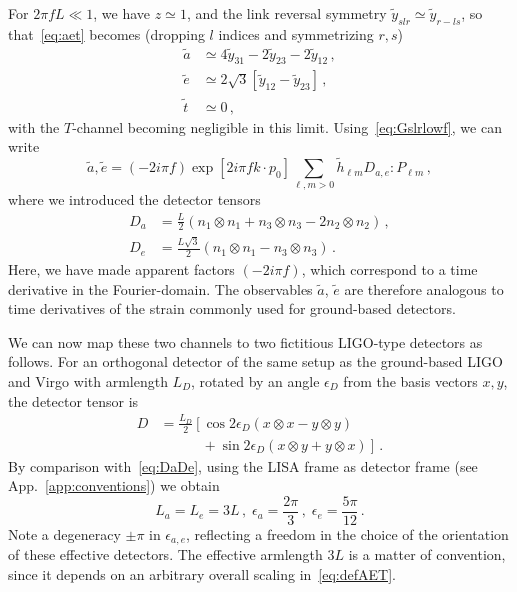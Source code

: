 \documentclass[aps,showpacs,twocolumn,prd,superscriptaddress,nofootinbib]{revtex4-1}
\newcommand{\be}{\begin{equation}}
\newcommand{\ee}{\end{equation}}
\newcommand{\bsub}{\begin{subequations}}
\newcommand{\esub}{\end{subequations}}
\newcommand{\nn}{\nonumber}
\begin{document}
For $2\pi f L \ll 1$, we have $z\simeq 1$, and the link reversal symmetry $\tilde{y}_{slr} \simeq \tilde{y}_{r-ls}$, so that~\eqref{eq:aet} becomes (dropping $l$ indices and symmetrizing $r,s$)
\bsub\label{eq:aetlowf}
\begin{align}
	\tilde{a} &\simeq 4\tilde{y}_{31} - 2 \tilde{y}_{23} - 2 \tilde{y}_{12} \,,\\
	\tilde{e} &\simeq 2\sqrt{3} \left[ \tilde{y}_{12}  - \tilde{y}_{23} \right] \,,\\
	\tilde{t} &\simeq 0 \,,
\end{align}
\esub
with the $T$-channel becoming negligible in this limit. Using~\eqref{eq:Gslrlowf}, we can write
\be\label{eq:aelowfmodes}
	\tilde{a}, \tilde{e} = (-2i\pi f) \exp\left[ 2 i \pi f k\cdot p_{0} \right] \sum_{\ell, m>0} \tilde{h}_{\ell m} D_{a,e} : P_{\ell m} \,,
\ee
where we introduced the detector tensors
\bsub\label{eq:DaDe}
\begin{align}
	D_{a} &= \frac{L}{2} \left( n_{1}\otimes n_{1} + n_{3} \otimes n_{3} - 2 n_{2} \otimes n_{2} \right) \,,\\
	D_{e} &= \frac{L\sqrt{3}}{2} \left( n_{1} \otimes n_{1} - n_{3} \otimes n_{3} \right) \,.
\end{align}
\esub
Here, we have made apparent factors $(-2i\pi f)$, which correspond to a time derivative in the Fourier-domain.
The observables $\tilde{a}$, $\tilde{e}$ are therefore analogous to time derivatives of the strain commonly used for ground-based detectors.

We can now map these two channels to two fictitious LIGO-type detectors as follows. For an orthogonal detector of the same setup as the ground-based LIGO and Virgo with armlength $L_{D}$, rotated by an angle $\epsilon_{D}$ from the basis vectors $x,y$, the detector tensor is
\begin{align}
	D &= \frac{L_{D}}{2} \left[ \cos 2\epsilon_{D} \left( x\otimes x - y\otimes y \right) \right. \nn\\
	& \qquad\quad + \left. \sin 2\epsilon_{D} \left( x\otimes y + y \otimes x\right) \right] \,.
\end{align}
By comparison with~\eqref{eq:DaDe}, using the LISA frame as detector frame (see App.~\ref{app:conventions}) we obtain
\be
	L_{a} = L_{e} = 3L \,, \; \epsilon_{a} = \frac{2\pi}{3} \,, \; \epsilon_{e} = \frac{5\pi}{12} \,.
\ee
Note a degeneracy $\pm \pi$ in $\epsilon_{a,e}$, reflecting a freedom in the choice of the orientation of these effective detectors. The effective armlength $3L$ is a matter of convention, since it depends on an arbitrary overall scaling in~\eqref{eq:defAET}.
\end{document}
